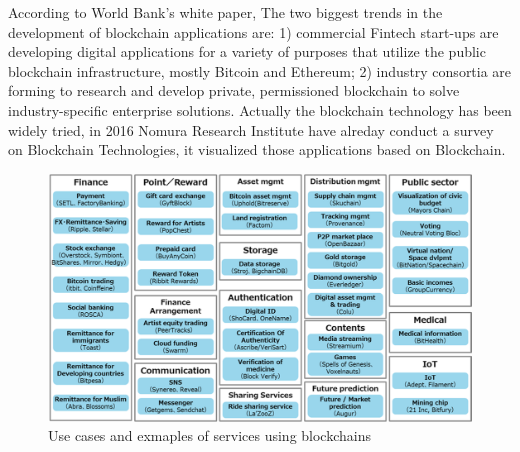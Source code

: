 According to World Bank's white paper, The two biggest trends in the development of blockchain applications are: 1) commercial Fintech start-ups are developing digital applications for a variety of purposes that utilize the public blockchain infrastructure, mostly Bitcoin and Ethereum;  2) industry consortia are forming to research and develop private, permissioned blockchain to solve industry-specific enterprise solutions. Actually the blockchain technology has been widely tried, in 2016 Nomura Research Institute have alreday conduct a survey on Blockchain Technologies, it visualized those applications based on Blockchain.
\begin{figure}[!htb]%
	\includegraphics[width=\textwidth]{charts/Fields}
	\caption{Use cases and exmaples of services using blockchains\cite{JapanS}}
\end{figure}

